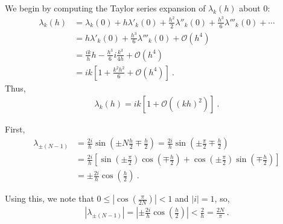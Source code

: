 \begin{questions}
\begin{solution}

We begin by computing the Taylor series expansion of $\lambda_k (h)$ about $0$:
\begin{align*}
\lambda_k(h) &= \lambda_k(0) + h\lambda'_k(0) + \frac{h^2}{2}\lambda''_k(0) + \frac{h^3}{6} \lambda'''_k(0) + \cdots \\
& = h\lambda'_k(0) + \frac{h^3}{6} \lambda'''_k(0) + \mathcal{O}(h^4) \\
& = \frac{ik}{h}h - \frac{h^3}{6}i\frac{k^3}{4h} + \mathcal{O}(h^4) \\
& = ik\left[ 1 + \frac{k^2h^2}{6} + \mathcal{O}(h^4) \right]~.
\end{align*}
Thus,
\begin{align*}
\lambda_k(h)  = ik\left[1 + \mathcal{O}((kh)^2)\right]~.
\end{align*}


\end{solution}

 

\begin{solution}

First,
\begin{align*}
\lambda_{\pm (N-1)} &= \frac{2i}{h}\sin\left(\pm N\frac{h}{2} \mp \frac{h}{2} \right) = \frac{2i}{h} \sin \left( \pm \frac{\pi}{2} \mp \frac{h}{2}\right) \\
& = \frac{2i}{h} \left[\sin\left(\pm \frac{\pi}{2}\right)\cos\left(\mp\frac{h}{2}\right) + \cos\left(\pm \frac{\pi}{2}\right)\sin\left(\mp\frac{h}{2}\right) \right] \\
& = \pm \frac{2i}{h}\cos\left(\frac{h}{2}\right)~.
\end{align*}

Using this, we note that $0 \leq |\cos\left(\frac{\pi}{2N}\right)| < 1$ and $|i| = 1$, so,
\begin{align*}
|\lambda_{\pm (N-1)}| =|\pm \frac{2i}{h}\cos\left(\frac{h}{2}\right)| < \frac{2}{h} = \frac{2N}{\pi}~.
\end{align*}

\end{solution}



\end{questions}

